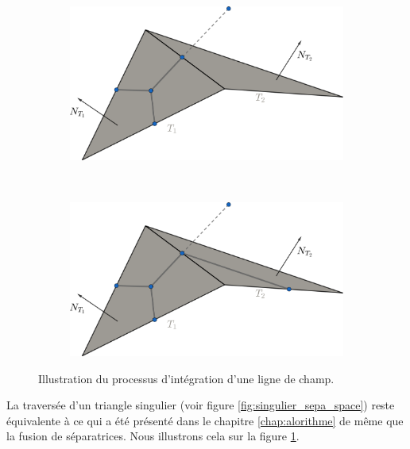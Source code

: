 \begin{figure}[h!]
\centering
\begin{subfigure}{0.65\textwidth}
    \includegraphics[width=\textwidth]{images/draw_sepa_space_1.pdf}
\end{subfigure}
\\[0.5cm]
\begin{subfigure}{0.65\textwidth}
    \includegraphics[width=\textwidth]{images/draw_sepa_space_2.pdf}
\end{subfigure}
\caption{Illustration du processus d'intégration d'une ligne de champ.}
\label{fig:draw_sepa_space}
\end{figure}

La traversée d'un triangle singulier (voir figure \ref{fig:singulier_sepa_space})  reste équivalente à ce qui a été présenté dans le chapitre \ref{chap:alorithme} de même que la fusion de séparatrices. Nous illustrons cela sur la figure \ref{fig:draw_sepa_space}.

